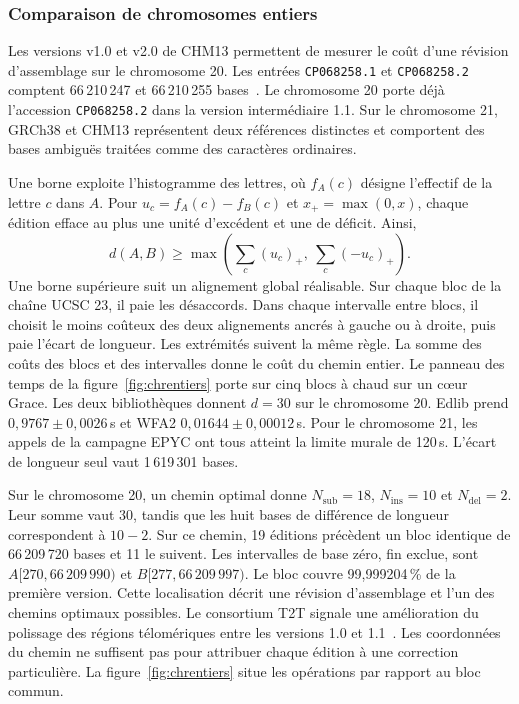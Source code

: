 \subsubsection{Comparaison de chromosomes entiers}\label{sec:assemblages}
Les versions v1.0 et v2.0 de CHM13 permettent de mesurer le coût d'une révision d'assemblage sur le chromosome 20. Les entrées \texttt{CP068258.1} et \texttt{CP068258.2} comptent 66\,210\,247 et 66\,210\,255 bases~\cite{chmreleases}. Le chromosome 20 porte déjà l'accession \texttt{CP068258.2} dans la version intermédiaire 1.1. Sur le chromosome 21, GRCh38 et CHM13 représentent deux références distinctes et comportent des bases ambiguës traitées comme des caractères ordinaires.

Une borne exploite l'histogramme des lettres, où \(f_A(c)\) désigne l'effectif de la lettre \(c\) dans \(A\). Pour \(u_c=f_A(c)-f_B(c)\) et \(x_+=\max(0,x)\), chaque édition efface au plus une unité d'excédent et une de déficit. Ainsi,
\[
 d(A,B)\ge\max\!\left(\sum_c(u_c)_+,\ \sum_c(-u_c)_+\right).
\]
Une borne supérieure suit un alignement global réalisable. Sur chaque bloc de la chaîne UCSC 23, il paie les désaccords. Dans chaque intervalle entre blocs, il choisit le moins coûteux des deux alignements ancrés à gauche ou à droite, puis paie l'écart de longueur. Les extrémités suivent la même règle. La somme des coûts des blocs et des intervalles donne le coût du chemin entier.
Le panneau des temps de la figure~\ref{fig:chrentiers} porte sur cinq blocs à chaud sur un cœur Grace. Les deux bibliothèques donnent \(d=30\) sur le chromosome 20. Edlib prend \(0{,}9767\pm0{,}0026\)\,s et WFA2 \(0{,}01644\pm0{,}00012\)\,s. Pour le chromosome 21, les appels de la campagne EPYC ont tous atteint la limite murale de 120\,s. L'écart de longueur seul vaut 1\,619\,301 bases.

Sur le chromosome 20, un chemin optimal donne \(N_{\mathrm{sub}}=18\), \(N_{\mathrm{ins}}=10\) et \(N_{\mathrm{del}}=2\). Leur somme vaut 30, tandis que les huit bases de différence de longueur correspondent à \(10-2\). Sur ce chemin, 19 éditions précèdent un bloc identique de 66\,209\,720 bases et 11 le suivent. Les intervalles de base zéro, fin exclue, sont \(A[270,66\,209\,990)\) et \(B[277,66\,209\,997)\). Le bloc couvre 99,999204\,\% de la première version. Cette localisation décrit une révision d'assemblage et l'un des chemins optimaux possibles. Le consortium T2T signale une amélioration du polissage des régions télomériques entre les versions 1.0 et 1.1~\cite{chmreleases,mccartney}. Les coordonnées du chemin ne suffisent pas pour attribuer chaque édition à une correction particulière. La figure~\ref{fig:chrentiers} situe les opérations par rapport au bloc commun.

